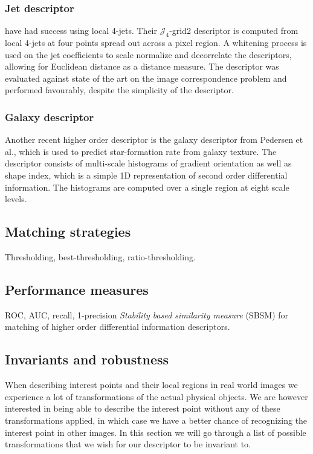 \documentclass[../thesis.tex]{subfiles}
\begin{document}
\subsubsection{Jet descriptor}

\cite{larsen2012jet} have had success using local 4-jets. Their
$\mathcal{J}_4$-grid2 descriptor is computed from local 4-jets at four points
spread out across a pixel region. A whitening process is used on the jet
coefficients to scale normalize and decorrelate the descriptors, allowing for
Euclidean distance as a distance measure. The descriptor was evaluated against
state of the art on the image correspondence problem and performed favourably,
despite the simplicity of the descriptor.

\subsubsection{Galaxy descriptor}

Another recent higher order descriptor is the galaxy descriptor from Pedersen
et al.\cite{pedersen2013shape}, which is used to predict star-formation
rate from galaxy texture. The descriptor consists of multi-scale histograms
of gradient orientation as well as shape index, which is a simple 1D
representation of second order differential information. The histograms are
computed over a single region at eight scale levels.

\subsection{Matching strategies}
\label{sec:matching_strategies}

Thresholding, best-thresholding, ratio-thresholding.

\subsection{Performance measures}
\label{sec:performance_measures}

ROC, AUC, recall, 1-precision
\emph{Stability based similarity measure} (SBSM) \cite{balmashnova2008novel} for matching of higher order differential information descriptors.


\subsection{Invariants and robustness}
When describing interest points and their local regions in real world images we experience a lot of transformations of the actual physical objects. We are however interested in being able to describe the interest point without any of these transformations applied, in which case we have a better chance of recognizing the interest point in other images. In this section we will go through a list of possible transformations that we wish for our descriptor to be invariant to.
\end{document}
